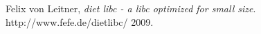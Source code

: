 \clearpage
{}
{}

\begin{thebibliography}{9}
 
  Felix von Leitner,
  \emph{diet libc - a libc optimized for small size}.
  http://www.fefe.de/dietlibc/
  2009.
 
\end{thebibliography}


